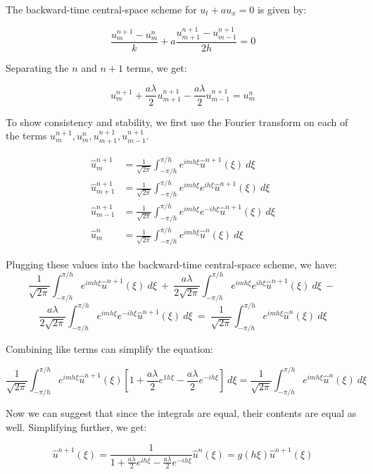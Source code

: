 \documentclass[12pt]{article}
\begin{document}
The backward-time central-space scheme for $u_t+au_x=0$ is given by:

$$ \frac{u_{m}^{n+1}-u_{m}^{n}}{k} + a\frac{u_{m+1}^{n+1}-u_{m-1}^{n+1}}{2h} = 0 $$

\noindent Separating the $n$ and $n+1$ terms, we get:

$$ u^{n+1}_{m} + \frac{a\lambda}{2}u^{n+1}_{m+1} - \frac{a\lambda}{2}u^{n+1}_{m-1} = u^{n}_{m} $$

To show consistency and stability, we first use the Fourier transform on each of the terms $u^{n+1}_{m},u^{n}_{m},u^{n+1}_{m+1},u^{n+1}_{m-1}$.

\begin{equation*}
    \begin{aligned}
    \hat{u}^{n+1}_{m} &= \frac{1}{\sqrt{2\pi}}\int_{-\pi/h}^{\pi/h}e^{imh\xi}\hat{u}^{n+1}(\xi)~d\xi\\
    \hat{u}^{n+1}_{m+1} &= \frac{1}{\sqrt{2\pi}}\int_{-\pi/h}^{\pi/h}e^{imh\xi}e^{ih\xi}\hat{u}^{n+1}(\xi)~d\xi\\
    \hat{u}^{n+1}_{m-1} &= \frac{1}{\sqrt{2\pi}}\int_{-\pi/h}^{\pi/h}e^{imh\xi}e^{-ih\xi}\hat{u}^{n+1}(\xi)~d\xi\\
    \hat{u}^{n}_{m} &= \frac{1}{\sqrt{2\pi}}\int_{-\pi/h}^{\pi/h}e^{imh\xi}\hat{u}^{n}(\xi)~d\xi
    \end{aligned}
\end{equation*}

\noindent Plugging these values into the backward-time central-space scheme, we have:
$$ \frac{1}{\sqrt{2\pi}}\int_{-\pi/h}^{\pi/h}e^{imh\xi}\hat{u}^{n+1}(\xi)~d\xi~+~ \frac{a\lambda}{2\sqrt{2\pi}}\int_{-\pi/h}^{\pi/h}e^{imh\xi}e^{ih\xi}\hat{u}^{n+1}(\xi)~d\xi ~-~$$
$$\frac{a\lambda}{2\sqrt{2\pi}}\int_{-\pi/h}^{\pi/h}e^{imh\xi}e^{-ih\xi}\hat{u}^{n+1}(\xi)~d\xi ~=~ \frac{1}{\sqrt{2\pi}}\int_{-\pi/h}^{\pi/h}e^{imh\xi}\hat{u}^{n}(\xi)~d\xi $$

\noindent Combining like terms can simplify the equation:

$$ \frac{1}{\sqrt{2\pi}}\int_{-\pi/h}^{\pi/h}e^{imh\xi}\hat{u}^{n+1}(\xi)\left[1+\frac{a\lambda}{2}e^{1h\xi} - \frac{a\lambda}{2}e^{-ih\xi}\right]~d\xi = 
\frac{1}{\sqrt{2\pi}}\int_{-\pi/h}^{\pi/h}e^{imh\xi}\hat{u}^{n}(\xi)~d\xi$$

\noindent Now we can suggest that since the integrals are equal, their contents are equal as well. Simplifying further, we get:

$$ \hat{u}^{n+1}(\xi) = \frac{1}{1+\frac{a\lambda}{2}e^{ih\xi} - \frac{a\lambda}{2}e^{-ih\xi}} \hat{u}^{n}(\xi) = g(h\xi) \hat{u}^{n+1}(\xi) $$
\end{document}
